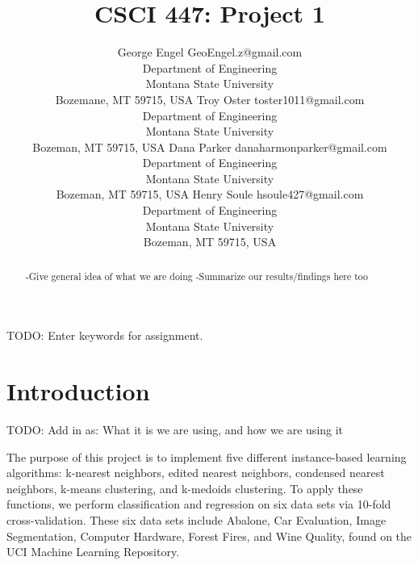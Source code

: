 \documentclass[twoside,11pt]{article}
\begin{document}
\title{CSCI 447: Project 1}

\author{\name George Engel \email GeoEngel.z@gmail.com \\
       \addr Department of Engineering\\
       Montana State University\\
       Bozemane, MT 59715, USA
       \AND
       \name Troy Oster \email toster1011@gmail.com \\
       \addr Department of Engineering\\
       Montana State University\\
       Bozeman, MT 59715, USA
       \AND
       \name Dana Parker \email danaharmonparker@gmail.com \\
       \addr Department of Engineering\\
       Montana State University\\
       Bozeman, MT 59715, USA
       \AND
       \name Henry Soule \email hsoule427@gmail.com \\
       \addr Department of Engineering\\
       Montana State University\\
       Bozeman, MT 59715, USA}


\maketitle

\begin{abstract}%

-Give general idea of what we are doing
-Summarize our results/findings here too

\end{abstract}

\begin{keywords}
    TODO: Enter keywords for assignment.
\end{keywords}

\section{Introduction}
TODO: Add in as: What it is we are using, and how we are using it

The purpose of this project is to implement five different instance-based learning algorithms: k-nearest neighbors, edited nearest neighbors, condensed nearest neighbors, k-means clustering, and k-medoids clustering. To apply these functions, we perform classification and regression on six data sets via 10-fold cross-validation. These six data sets include Abalone, Car Evaluation, Image Segmentation, Computer Hardware, Forest Fires, and Wine Quality, found on the UCI Machine Learning Repository.
\end{document}
